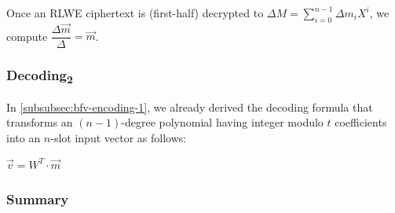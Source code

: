 Once an RLWE ciphertext is (first-half) decrypted to $\Delta M = \sum\limits_{i=0}^{n-1}\Delta m_iX^i$, we compute $\dfrac{\Delta\vec{m}}{\Delta} = \vec{m}$.




\subsubsection{\textsf{Decoding\textsubscript{2}}}  


In \autoref{subsubsec:bfv-encoding-1}, we already derived the decoding formula that transforms an $(n-1)$-degree polynomial having integer modulo $t$ coefficients into an $n$-slot input vector as follows: 

$\vec{v} = W^T \cdot \vec{m}$


\subsubsection{Summary}
\label{subsubsec:bfv-encoding-summary}

